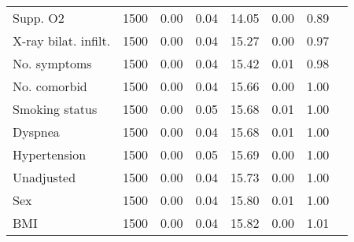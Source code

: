 \documentclass{article}
\begin{document}
{\begin{longtable}{lccccccc}
Supp. O2 & 1500 & 0.00 & 0.04 & 14.05 &  0.00 & 0.89 \\ 
X-ray bilat. infilt. & 1500 & 0.00 & 0.04 & 15.27 &  0.00 & 0.97 \\ 
No. symptoms & 1500 & 0.00 & 0.04 & 15.42 &  0.01 & 0.98 \\ 
No. comorbid & 1500 & 0.00 & 0.04 & 15.66 &  0.00 & 1.00 \\ 
Smoking status & 1500 & 0.00 & 0.05 & 15.68 &  0.01 & 1.00 \\ 
Dyspnea & 1500 & 0.00 & 0.04 & 15.68 &  0.01 & 1.00 \\ 
Hypertension & 1500 & 0.00 & 0.05 & 15.69 &  0.00 & 1.00 \\ 
Unadjusted & 1500 & 0.00 & 0.04 & 15.73 &  0.00 & 1.00 \\ 
Sex & 1500 & 0.00 & 0.04 & 15.80 &  0.01 & 1.00 \\ 
BMI & 1500 & 0.00 & 0.04 & 15.82 &  0.00 & 1.01 \\
\bottomrule
\hline
\end{longtable}
}

\clearpage
\end{document}
